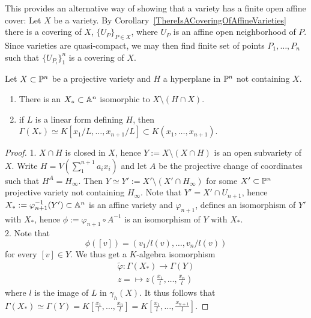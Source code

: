     \begin{remark}
        This provides an alternative way of showing that a variety has a finite open affine cover: Let $X$ be a variety. By Corollary~\ref{ThereIsACoveringOfAffineVarieties} there is a covering of $X$, $\{U_P\}_{P \in X}$, where $U_P$ is an affine open neighborhood of $P$. Since varieties are quasi-compact, we may then find finite set of points $P_1,\dots,P_n$ such that $\{U_{P_i}\}_1^n$ is a covering of $X$.
    \end{remark}
    \begin{lemma}
        Let $X\subset \mathbb{P}^n$ be a projective variety and $H$ a hyperplane in $\mathbb{P}^n$ not containing $X$.
        \begin{enumerate}
            \item There is an $X_\ast\subset \mathbb{A}^n$ isomorphic to $X\setminus (H\cap X)$.
            \item if $L$ is a linear form defining $H$, then $\Gamma(X_\ast)\simeq K[x_1/L,\dots,x_{n+1}/L]\subset K(x_1,\dots,x_{n+1})$.
        \end{enumerate}
    \end{lemma}
    \begin{proof}
        1. $X\cap H$ is closed in $X$, hence $Y:=X\setminus (X\cap H)$ is an open subvariety of $X$. Write $H=V\left(\sum_1^{n+1} a_ix_i\right)$ and let $A$ be the projective change of coordinates such that $H^A=H_\infty$. Then $Y\simeq Y':= X'\setminus(X'\cap H_\infty)$ for some $X'\subset \mathbb{P}^n$ projective variety not containing $H_\infty$. Note that $Y' = X'\cap U_{n+1}$, hence $X_\ast:= \varphi_{n+1}^{-1}(Y') \subset \mathbb{A}^n$ is an affine variety and $\varphi_{n+1}$, defines an isomorphism of $Y'$ with $X_\ast$, hence $\phi:=\varphi_{n+1}\circ A^{-1}$ is an isomorphism of $Y$ with $X_\ast$.\\
        2. Note that
        $$\phi([v]) = (v_1/l(v),\dots,v_n/l(v))$$
        for every $[v]\in Y$. We thus get a $K$-algebra isomorphism
        \begin{gather*}
            \widetilde{\varphi}: \Gamma(X_\ast) \rightarrow \Gamma(Y)\\
            z = \mapsto z\left(\frac{x_1}{l},\dots,\frac{x_n}{l}\right) 
        \end{gather*}
        where $l$ is the image of $L$ in $\gamma_h(X)$. It thus follows that $\Gamma(X_\ast)\simeq \Gamma(Y)=K\left[\frac{x_1}{l},\dots,\frac{x_n}{l}\right]= K\left[\frac{x_1}{l},\dots,\frac{x_{n+1}}{l}\right]$. 
    \end{proof}
